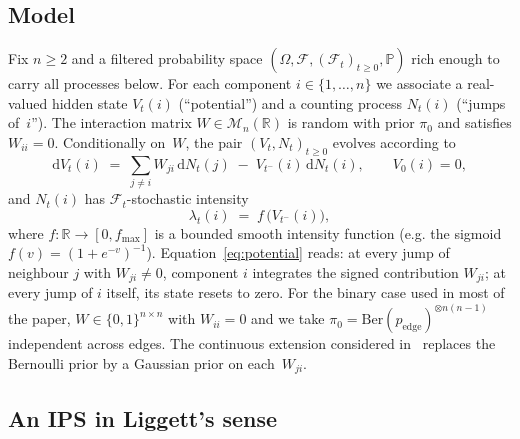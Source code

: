\documentclass[11pt,a4paper]{article}
\theoremstyle{definition}
\newcommand{\R}{\mathbb{R}}
\newcommand{\Prob}{\mathbb{P}}
\newcommand{\cF}{\mathcal{F}}
\newcommand{\cM}{\mathcal{M}}
\newcommand{\Ber}{\mathrm{Ber}}
\begin{document}
\subsection{Model}
\label{subsec:model}

Fix $n \geq 2$ and a filtered probability space $(\Omega, \cF,
(\cF_t)_{t \geq 0}, \Prob)$ rich enough to carry all processes below.
For each component $i \in \{1, \ldots, n\}$ we associate a real-valued
hidden state $V_t(i)$ (``potential'') and a counting process $N_t(i)$
(``jumps of~$i$''). The interaction matrix
$W \in \cM_n(\R)$ is random with prior $\pi_0$ and satisfies
$W_{i i} = 0$. Conditionally on~$W$, the pair $(V_t, N_t)_{t \geq 0}$
evolves according to
\begin{equation}
    \mathrm{d} V_t(i) \;=\; \sum_{j \neq i} W_{j i} \,\mathrm{d} N_t(j)
    \;-\; V_{t^-}(i) \,\mathrm{d} N_t(i), \qquad V_0(i) = 0,
    \label{eq:potential}
\end{equation}
and $N_t(i)$ has $\cF_t$-stochastic intensity
\begin{equation}
    \lambda_t(i) \;=\; f\,\bigl( V_{t^-}(i) \bigr),
    \label{eq:intensity}
\end{equation}
where $f \colon \R \to [0, f_{\max}]$ is a bounded smooth intensity
function (e.g. the sigmoid $f(v) = (1 + e^{-v})^{-1}$).
Equation~\eqref{eq:potential} reads: at every jump of neighbour $j$
with $W_{j i} \neq 0$, component $i$ integrates the signed contribution
$W_{j i}$; at every jump of $i$ itself, its state resets to zero.
For the binary case used in most of the
paper, $W \in \{0, 1\}^{n \times n}$ with $W_{i i} = 0$ and we take
$\pi_0 = \Ber(p_{\mathrm{edge}})^{\otimes n(n-1)}$ independent across
edges. The continuous extension considered in~ replaces
the Bernoulli prior by a Gaussian prior on each~$W_{j i}$.

\subsection{An IPS in Liggett's sense}
\label{subsec:ips}
\end{document}
